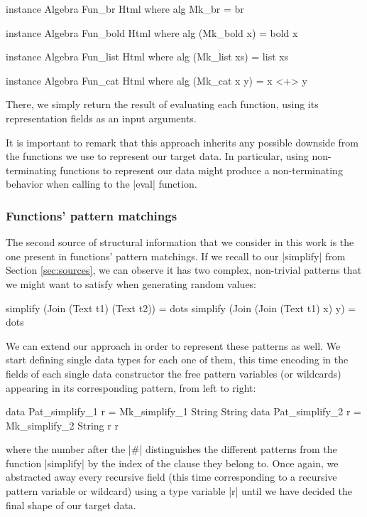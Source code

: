 \begin{code}
instance Algebra Fun_br Html where
  alg Mk_br = br

instance Algebra Fun_bold Html where
  alg (Mk_bold x) = bold x

instance Algebra Fun_list Html where
  alg (Mk_list xs) = list xs

instance Algebra Fun_cat Html where
  alg (Mk_cat x y) = x <+> y
\end{code}
%
There, we simply return the result of evaluating each function, using its
representation fields as an input arguments.


It is important to remark that this approach inherits any possible downside from
the functions we use to represent our target data.
%
In particular, using non-terminating functions to represent our data might
produce a non-terminating behavior when calling to the |eval| function.


%
%
\subsubsection{Functions' pattern matchings}

The second source of structural information that we consider in this work is the
one present in functions' pattern matchings.
%
If we recall to our |simplify| from Section \ref{sec:sources}, we can observe it
has two complex, non-trivial patterns that we might want to satisfy when
generating random values:

\begin{code}
simplify (Join (Text t1) (Text t2))   = dots
simplify (Join (Join (Text t1) x) y)  = dots
\end{code}
%
We can extend our approach in order to represent these patterns as well.
%
We start defining single data types for each one of them, this time encoding in
the fields of each single data constructor the free pattern variables (or
wildcards) appearing in its corresponding pattern, from left to right:

\begin{code}
data Pat_simplify_1 r = Mk_simplify_1 String String
data Pat_simplify_2 r = Mk_simplify_2 String r r
\end{code}
%
where the number after the |#| distinguishes the different patterns from the
function |simplify| by the index of the clause they belong to.
%
Once again, we abstracted away every recursive field (this time corresponding to
a recursive pattern variable or wildcard) using a type variable |r| until we
have decided the final shape of our target data.



